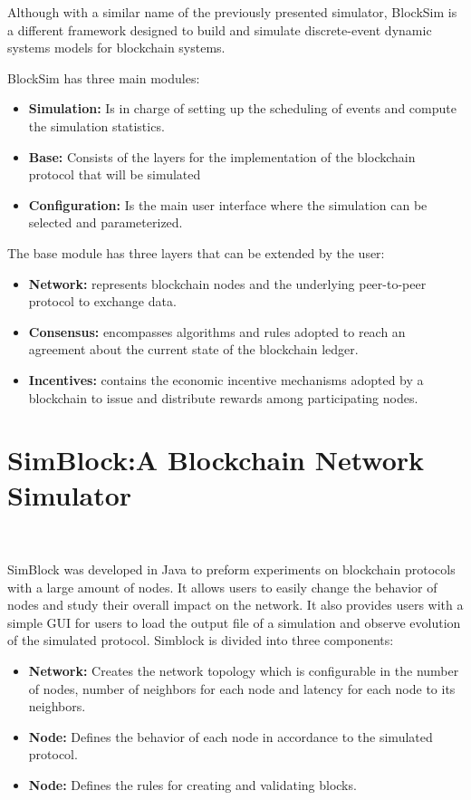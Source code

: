 Although with a similar name of the previously presented simulator, BlockSim is a different 
framework designed to build and simulate discrete-event dynamic systems models for blockchain systems.

BlockSim has three main modules:
\begin{itemize}
  \item \textbf{Simulation:} Is in charge of setting up the scheduling of events and compute
  the simulation statistics.
  \item \textbf{Base:} Consists of the layers for the implementation of the blockchain protocol
  that will be simulated
  \item \textbf{Configuration:}  Is the main user interface where the simulation can be 
  selected and parameterized.
\end{itemize}

The base module has three layers that can be extended by the user:

\begin{itemize}
  \item \textbf{Network:} represents blockchain nodes and the underlying peer-to-peer protocol
  to exchange data.
  \item \textbf{Consensus:} encompasses algorithms and rules adopted to reach an agreement 
  about the current state of the blockchain ledger.
  \item \textbf{Incentives:} contains the economic incentive mechanisms adopted by a 
  blockchain to issue and distribute rewards among participating nodes.
\end{itemize}

\section{SimBlock:A Blockchain Network Simulator}~\label{subsec:simblock}

SimBlock was developed in Java to preform experiments on blockchain protocols
with a large amount of nodes. It allows users to easily change the behavior of nodes
and study their overall impact on the network. It also provides users with a simple GUI for
users to load the output file of a simulation and observe evolution of the simulated protocol.
Simblock is divided into three components:

\begin{itemize}
  \item \textbf{Network:} Creates the network topology which is configurable in the number
  of nodes, number of neighbors for each node and latency for each node to its neighbors.
  \item \textbf{Node:} Defines the behavior of each node in accordance to the simulated protocol.
  \item \textbf{Node:} Defines the rules for creating and validating blocks.
\end{itemize}

